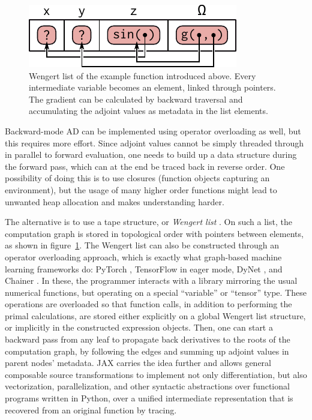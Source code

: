 \begin{figure}[t]
  \centering
  \includegraphics{figures/wengert-list}
  \caption{Wengert list of the example function \protect{} introduced above.
    Every intermediate variable becomes an element, linked through pointers.  The gradient can be
    calculated by backward traversal and accumulating the adjoint values as metadata in the list
    elements.}
  \label{fig:wengert-list}
\end{figure}

Backward-mode AD can be implemented using operator overloading as well, but this requires more
effort.  Since adjoint values cannot be simply threaded through in parallel to forward evaluation,
one needs to build up a data structure during the forward pass, which can at the end be traced back
in reverse order.  One possibility of doing this is to use closures (function objects capturing an
environment), but the usage of many higher order functions might lead to unwanted heap allocation
and makes understanding harder.

The alternative is to use a tape structure, or \emph{Wengert list} \parencites[][section
3]{baydin2018automatic}.  On such a list, the computation graph is stored in topological order with
pointers between elements, as shown in figure~\ref{fig:wengert-list}.  The Wengert list can also be
constructed through an operator overloading approach, which is exactly what graph-based machine
learning frameworks do: PyTorch \parencite{paszke2017automatic}, TensorFlow
\parencite{abadi2015tensorflow} in eager mode, DyNet \parencite{neubig2017dynet}, and Chainer
\parencite{tokui2015chainer}.  In these, the programmer interacts with a library mirroring the usual
numerical functions, but operating on a special \enquote{variable} or \enquote{tensor} type.  These
operations are overloaded so that function calls, in addition to performing the primal calculations,
are stored either explicitly on a global Wengert list structure, or implicitly in the constructed
expression objects.  Then, one can start a backward pass from any leaf to propagate back derivatives
to the roots of the computation graph, by following the edges and summing up adjoint values in
parent nodes' metadata.  JAX \parencite{bradbury2018jax} carries the idea further and allows general
composable source transformations to implement not only differentiation, but also vectorization,
parallelization, and other syntactic abstractions over functional programs written in Python, over a
unified intermediate representation that is recovered from an original function by tracing.

